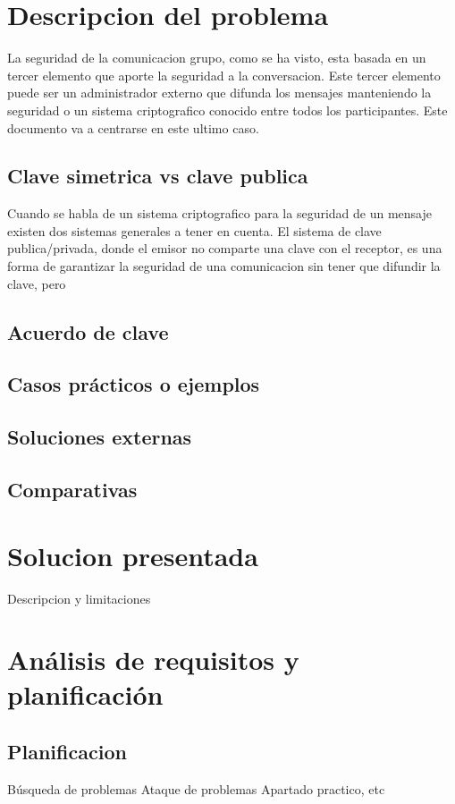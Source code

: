 \documentclass[10pt, a4paper, spanish]{report}
\begin{document}
\section{Descripcion del problema}
La seguridad de la comunicacion grupo, como se ha visto, esta basada en un tercer elemento que aporte la seguridad a la conversacion. Este tercer elemento puede ser un administrador externo que difunda los mensajes manteniendo la seguridad o un sistema criptografico conocido entre todos los participantes. Este documento va a centrarse en este ultimo caso.

    \subsection{Clave simetrica vs clave publica}
    Cuando se habla de un sistema criptografico para la seguridad de un mensaje existen dos sistemas generales a tener en cuenta. El sistema de clave publica/privada, donde el emisor no comparte una clave con el receptor, es una forma de garantizar la seguridad de una comunicacion sin tener que difundir la clave, pero 
    \subsection{Acuerdo de clave}
    \subsection{Casos prácticos o ejemplos }
    \subsection{Soluciones externas }
    \subsection{Comparativas }

\section{Solucion presentada}
Descripcion y limitaciones

\section{Análisis de requisitos y planificación}
    \subsection{Planificacion }
    Búsqueda de problemas
    Ataque de problemas
    Apartado practico, etc
\end{document}
